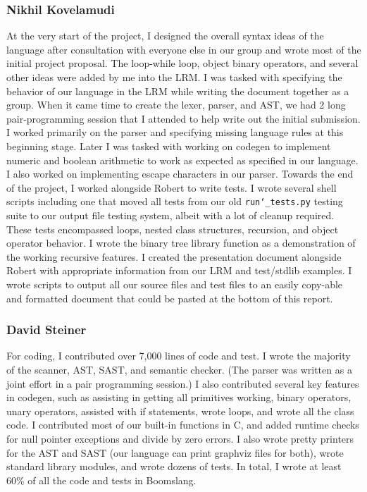 \documentclass{article}
\begin{document}
\subsubsection{Nikhil Kovelamudi}
At the very start of the project, I designed the overall syntax ideas of the language after consultation with everyone else in our group and wrote most of the initial project proposal.  The loop-while loop, object binary operators, and several other ideas were added by me into the LRM.  I was tasked with specifying the behavior of our language in the LRM while writing the document together as a group.  When it came time to create the lexer, parser, and AST, we had 2 long pair-programming session that I attended to help write out the initial submission.  I worked primarily on the parser and specifying missing language rules at this beginning stage.  Later I was tasked with working on codegen to implement numeric and boolean arithmetic to work as expected as specified in our language.  I also worked on implementing escape characters in our parser.  Towards the end of the project, I worked alongside Robert to write tests.  I wrote several shell scripts including one that moved all tests from our old \texttt{run\char`_tests.py} testing suite to our output file testing system, albeit with a lot of cleanup required.  These tests encompassed loops, nested class structures, recursion, and object operator behavior.  I wrote the binary tree library function as a demonstration of the working recursive features.  I created the presentation document alongside Robert with appropriate information from our LRM and test/stdlib examples.  I wrote scripts to output all our source files and test files to an easily copy-able and formatted document that could be pasted at the bottom of this report.  


\subsubsection{David Steiner}
For coding, I contributed over 7,000 lines of code and test. I wrote the majority of the scanner, AST, SAST, and semantic checker. (The parser was written as a joint effort in a pair programming session.) I also contributed several key features in codegen, such as assisting in getting all primitives working, binary operators, unary operators, assisted with if statements, wrote loops, and wrote all the class code. I contributed most of our built-in functions in C, and added runtime checks for null pointer exceptions and divide by zero errors. I also wrote pretty printers for the AST and SAST (our language can print graphviz files for both), wrote standard library modules, and wrote dozens of tests. In total, I wrote at least 60\% of all the code and tests in Boomslang.
\end{document}

